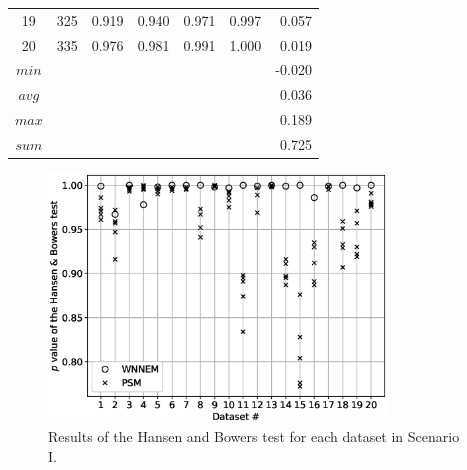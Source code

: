\begin{table}[h]
\begin{tabular}{ccccccr}
				19      & 325     & 0.919     & 0.940     & 0.971     & 0.997 & 0.057      \\
				20      & 335     & 0.976     & 0.981     & 0.991     & 1.000 & 0.019      \\
				\midrule
				$min$   &         &           &           &           &       & -0.020     \\
				$avg$   &         &           &           &           &       & 0.036      \\
				$max$   &         &           &           &           &       & 0.189      \\
				$sum$   &         &           &           &           &       & 0.725      \\
				\bottomrule
			\end{tabular}
		\end{table}
								
								
		\begin{figure}[h]
			\centering
                \captionsetup{justification=centering}
			\includegraphics[width=0.8\textwidth]{assets/figures/control_group_selection/wnnem/scenI/hbp.eps}
			\caption{Results of the Hansen and Bowers test for each dataset in Scenario I.}
			\label{fig:wnnem_scen_I_hbp}    
		\end{figure}
								
